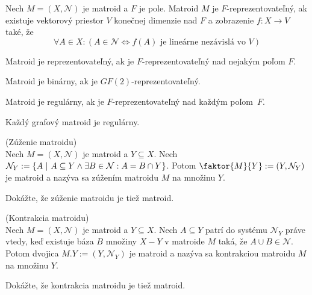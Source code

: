 \begin{definition}
Nech $M=(X, \mathcal{N})$ je matroid a $F$ je pole. Matroid $M$ je $F$-reprezentovateľný, ak
existuje vektorový priestor $V$ konečnej dimenzie nad $F$ a zobrazenie $f:X \to V$ také, že
$$\forall A \in X: \left(A \in \mathcal{N} \Longleftrightarrow f(A) \text{ je lineárne nezávislá vo } V \right)$$ 
\end{definition}

\begin{definition}
Matroid je reprezentovateľný, ak je $F$-reprezentovateľný nad nejakým poľom $F$.
\end{definition}

\begin{definition}
Matroid je binárny, ak je $GF(2)$-reprezentovateľný.
\end{definition}

\begin{definition}
Matroid je regulárny, ak je $F$-reprezentovateľný nad každým poľom~$F$.
\end{definition}

\begin{theorem_hard}
Každý grafový matroid je regulárny.
\end{theorem_hard}



\begin{definition}{(Zúženie matroidu)}\\
Nech $M = (X, \mathcal{N})$ je matroid a $Y \subseteq X$. 
Nech $\mathcal{N}_Y := \left\{A ~|~ A \subseteq Y \wedge \exists B \in \mathcal{N}: A = B \cap Y\right\}$.
Potom $\faktor{M}{Y} := (Y, \mathcal{N}_Y)$ je matroid a nazýva sa zúžením matroidu $M$ na množinu $Y$.
\end{definition}
\begin{exercise}
Dokážte, že zúženie matroidu je tiež matroid.
\end{exercise}

\begin{definition}{(Kontrakcia matroidu)}\\
Nech $M = (X, \mathcal{N})$ je matroid a $Y \subseteq X$. 
Nech $A \subseteq Y$ patrí do systému $\mathcal{N}_Y$ práve vtedy, keď existuje 
báza $B$ množiny $X-Y$ v matroide $M$ taká, že $A \cup B \in \mathcal{N}$. Potom dvojica
$M.Y := (Y, \mathcal{N}_Y)$ je matroid a nazýva sa kontrakciou matroidu $M$ na množinu $Y$.
\end{definition}
\begin{exercise}
Dokážte, že kontrakcia matroidu je tiež matroid.
\end{exercise}

